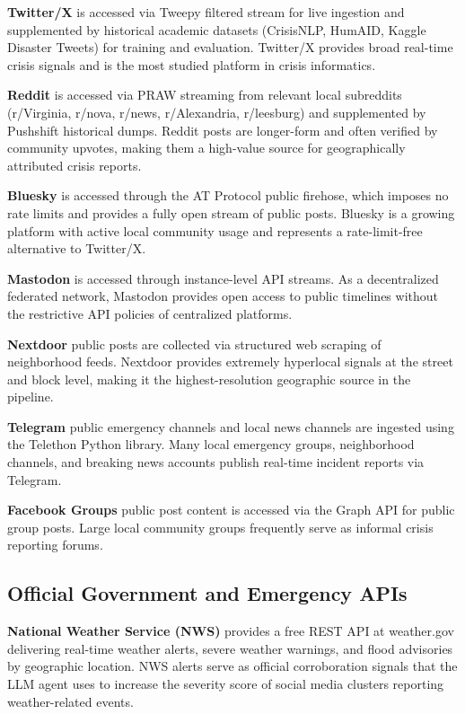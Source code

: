 \documentclass[conference]{IEEEtran}
\begin{document}
\textbf{Twitter/X} is accessed via Tweepy filtered stream for live ingestion
and supplemented by historical academic datasets (CrisisNLP, HumAID, Kaggle
Disaster Tweets) for training and evaluation. Twitter/X provides broad
real-time crisis signals and is the most studied platform in crisis informatics.

\textbf{Reddit} is accessed via PRAW streaming from relevant local subreddits
(r/Virginia, r/nova, r/news, r/Alexandria, r/leesburg) and supplemented by
Pushshift historical dumps. Reddit posts are longer-form and often verified by
community upvotes, making them a high-value source for geographically attributed
crisis reports.

\textbf{Bluesky} is accessed through the AT Protocol public firehose, which
imposes no rate limits and provides a fully open stream of public posts. Bluesky
is a growing platform with active local community usage and represents a
rate-limit-free alternative to Twitter/X.

\textbf{Mastodon} is accessed through instance-level API streams. As a
decentralized federated network, Mastodon provides open access to public
timelines without the restrictive API policies of centralized platforms.

\textbf{Nextdoor} public posts are collected via structured web scraping of
neighborhood feeds. Nextdoor provides extremely hyperlocal signals at the
street and block level, making it the highest-resolution geographic source
in the pipeline.

\textbf{Telegram} public emergency channels and local news channels are
ingested using the Telethon Python library. Many local emergency groups,
neighborhood channels, and breaking news accounts publish real-time incident
reports via Telegram.

\textbf{Facebook Groups} public post content is accessed via the Graph API
for public group posts. Large local community groups frequently serve as
informal crisis reporting forums.

\subsection{Official Government and Emergency APIs}

\textbf{National Weather Service (NWS)} provides a free REST API at
weather.gov delivering real-time weather alerts, severe weather warnings,
and flood advisories by geographic location. NWS alerts serve as official
corroboration signals that the LLM agent uses to increase the severity score
of social media clusters reporting weather-related events.
\end{document}
